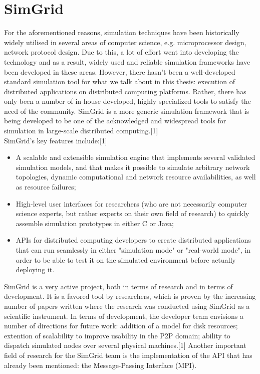 \documentclass[a4paper]{article}
\begin{document}
\section{SimGrid}
For the aforementioned reasons, simulation techniques have been
historically widely utilised in several areas of computer science,
e.g. microprocessor design, network protocol design. Due to this, a
lot of effort went into developing the technology and as a result,
widely used and reliable simulation frameworks have been developed in
these areas. However, there hasn't been a well-developed standard
simulation tool for what we talk about in this thesis: execution of
distributed applications on distributed computing platforms. Rather,
there has only been a number of in-house developed, highly specialized
tools to satisfy the need of the community. SimGrid is a more generic
simulation framework that is being developed to be one of the
acknowledged and widespread tools for simulation in large-scale
distributed computing.[1]\\
SimGrid's key features include:[1]
\begin{itemize}
\item A scalable and extensible simulation engine that implements
  several validated simulation models, and that makes it possible to
  simulate arbitrary network topologies, dynamic computational and
  network resource availabilities, as well as resource failures;
\item High-level user interfaces for researchers (who are not
  necessarily computer science experts, but rather experts on their own
  field of research) to quickly assemble simulation prototypes in either
  C or Java;
\item APIs for distributed computing developers to create distributed
  applications that can run seamlessly in either "simulation mode" or
  "real-world mode", in order to be able to test it on the simulated
  environment before actually deploying it.
\end{itemize}
SimGrid is a very active project, both in terms of research and in
terms of development. It is a favored tool by researchers, which is
proven by the increasing number of papers written where the research
was conducted using SimGrid as a scientific instrument. In terms of
development, the developer team envisions a number of directions for
future work: addition of a model for disk resources; extention of
scalability to improve usability in the P2P domain; ability to
dispatch simulated nodes over several physical machines.[1] Another
important field of research for the SimGrid team is the implementation
of the API that has already been mentioned: the Message-Passing
Interface (MPI).
\end{document}
